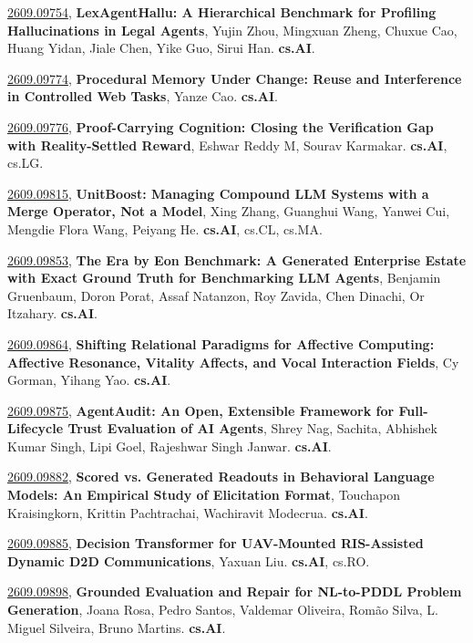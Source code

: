 \documentclass[9pt, a4paper]{article}
\theoremstyle{plain}
\theoremstyle{definition}
\theoremstyle{remark}
\newcommand{\arxivwithtarget}[3]{\hypertarget{#1}{}\href{https://arxiv.org/abs/#1}{#1}, \textbf{\textcolor{arxivblue}{#2}}, #3. }
\begin{document}
\arxivwithtarget{2609.09754}{LexAgentHallu: A Hierarchical Benchmark for Profiling Hallucinations in Legal Agents}{Yujin Zhou, Mingxuan Zheng, Chuxue Cao, Huang Yidan, Jiale Chen, Yike Guo, Sirui Han}\textbf{cs.AI}.



\arxivwithtarget{2609.09774}{Procedural Memory Under Change: Reuse and Interference in Controlled Web Tasks}{Yanze Cao}\textbf{cs.AI}.



\arxivwithtarget{2609.09776}{Proof-Carrying Cognition: Closing the Verification Gap with Reality-Settled Reward}{Eshwar Reddy M, Sourav Karmakar}\textbf{cs.AI}, cs.LG.



\arxivwithtarget{2609.09815}{UnitBoost: Managing Compound LLM Systems with a Merge Operator, Not a Model}{Xing Zhang, Guanghui Wang, Yanwei Cui, Mengdie Flora Wang, Peiyang He}\textbf{cs.AI}, cs.CL, cs.MA.



\arxivwithtarget{2609.09853}{The Era by Eon Benchmark: A Generated Enterprise Estate with Exact Ground Truth for Benchmarking LLM Agents}{Benjamin Gruenbaum, Doron Porat, Assaf Natanzon, Roy Zavida, Chen Dinachi, Or Itzahary}\textbf{cs.AI}.



\arxivwithtarget{2609.09864}{Shifting Relational Paradigms for Affective Computing: Affective Resonance, Vitality Affects, and Vocal Interaction Fields}{Cy Gorman, Yihang Yao}\textbf{cs.AI}.



\arxivwithtarget{2609.09875}{AgentAudit: An Open, Extensible Framework for Full-Lifecycle Trust Evaluation of AI Agents}{Shrey Nag, Sachita, Abhishek Kumar Singh, Lipi Goel, Rajeshwar Singh Janwar}\textbf{cs.AI}.



\arxivwithtarget{2609.09882}{Scored vs. Generated Readouts in Behavioral Language Models: An Empirical Study of Elicitation Format}{Touchapon Kraisingkorn, Krittin Pachtrachai, Wachiravit Modecrua}\textbf{cs.AI}.



\arxivwithtarget{2609.09885}{Decision Transformer for UAV-Mounted RIS-Assisted Dynamic D2D Communications}{Yaxuan Liu}\textbf{cs.AI}, cs.RO.



\arxivwithtarget{2609.09898}{Grounded Evaluation and Repair for NL-to-PDDL Problem Generation}{Joana Rosa, Pedro Santos, Valdemar Oliveira, Romão Silva, L. Miguel Silveira, Bruno Martins}\textbf{cs.AI}.
\end{document}
